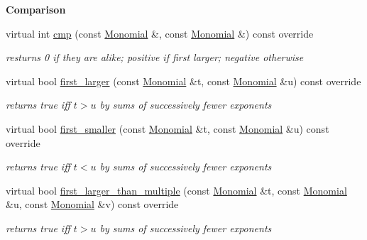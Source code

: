 \begin{Indent}\textbf{ Comparison}\par
\begin{DoxyCompactItemize}
\item 
\mbox{\label{group__orderinggroup_afcba2ade4149724f666064643e502769}} 
virtual int \hyperlink{group__orderinggroup_afcba2ade4149724f666064643e502769}{cmp} (const \hyperlink{group__polygroup_class_monomial}{Monomial} \&, const \hyperlink{group__polygroup_class_monomial}{Monomial} \&) const override
\begin{DoxyCompactList}\small\item\em resturns 0 if they are alike; positive if first larger; negative otherwise \end{DoxyCompactList}\item 
\mbox{\label{group__orderinggroup_a78e346a28a1dde835e487c01c7ce2b5a}} 
virtual bool \hyperlink{group__orderinggroup_a78e346a28a1dde835e487c01c7ce2b5a}{first\+\_\+larger} (const \hyperlink{group__polygroup_class_monomial}{Monomial} \&t, const \hyperlink{group__polygroup_class_monomial}{Monomial} \&u) const override
\begin{DoxyCompactList}\small\item\em returns {\ttfamily true} iff $t>u$ by sums of successively fewer exponents \end{DoxyCompactList}\item 
\mbox{\label{group__orderinggroup_a131b09d8226c2dc5f0718f90ab8e009f}} 
virtual bool \hyperlink{group__orderinggroup_a131b09d8226c2dc5f0718f90ab8e009f}{first\+\_\+smaller} (const \hyperlink{group__polygroup_class_monomial}{Monomial} \&t, const \hyperlink{group__polygroup_class_monomial}{Monomial} \&u) const override
\begin{DoxyCompactList}\small\item\em returns {\ttfamily true} iff $t< u$ by sums of successively fewer exponents \end{DoxyCompactList}\item 
\mbox{\label{group__orderinggroup_a7841ec558b2858c2a6eda8fd6073641e}} 
virtual bool \hyperlink{group__orderinggroup_a7841ec558b2858c2a6eda8fd6073641e}{first\+\_\+larger\+\_\+than\+\_\+multiple} (const \hyperlink{group__polygroup_class_monomial}{Monomial} \&t, const \hyperlink{group__polygroup_class_monomial}{Monomial} \&u, const \hyperlink{group__polygroup_class_monomial}{Monomial} \&v) const override
\begin{DoxyCompactList}\small\item\em returns {\ttfamily true} iff $t>u$ by sums of successively fewer exponents \end{DoxyCompactList}\end{DoxyCompactItemize}
\end{Indent}
